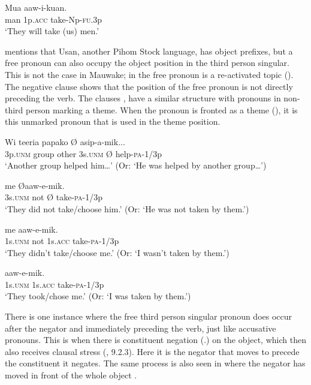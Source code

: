 \ea%
\label{ex:3:x557}
\gll Mua  aaw-i-kuan. \\
man 1p.\textsc{acc} take-Np-\textsc{fu}.3p\\
\glt`They will take (us) men.'
\z

\citet[52--53]{Reesink1987} mentions that Usan, another Pihom Stock language, has object prefixes, but a free pronoun can also occupy the object position in the third person singular. This is not the case in Mauwake; in  the free pronoun  is a re-activated topic (). The negative clause  shows that the position of the free pronoun is not directly preceding the verb. The clauses ,  have a similar structure with pronouns in non-third person marking a theme. When the pronoun is fronted as a theme (), it is this unmarked pronoun that is used in the theme position. 

\ea%
\label{ex:3:x1354}
\gll Wi teeria papako  {\O} asip-a-mik... \\
3p.\textsc{unm} group other 3s.\textsc{unm} {\O} help-\textsc{pa}-1/3p\\
\glt`Another group helped him{\dots}' (Or: `He was helped by another group{\dots}')
\z

\ea%
\label{ex:3:x1353}
\gll {} me {\O aaw-e-mik.} \\
3s.\textsc{unm} not {\O} take-\textsc{pa}-1/3p\\
\glt`They did not take/choose him.' (Or: `He was not taken by them.')
\z

\ea%
\label{ex:3:x684}
\gll {} me  aaw-e-mik. \\
1s.\textsc{unm} not 1s.\textsc{acc} take-\textsc{pa}-1/3p\\
\glt`They didn't take/choose me.' (Or: `I wasn't taken by them.')
\z

\ea%
\label{ex:3:x560}
\gll {}  aaw-e-mik. \\
1s.\textsc{unm} 1s.\textsc{acc} take-\textsc{pa}-1/3p\\
\glt`They took/chose me.' (Or: `I was taken by them.')
\z

There is one instance where the free third person singular pronoun does occur after the negator and immediately preceding the verb, just like accusative pronouns. This is when there is constituent negation (.) on the object, which then also receives clausal stress  (, 9.2.3). Here it is the negator that moves to precede the constituent it negates. The same process is also seen in  where the negator has moved in front of the whole object . 

